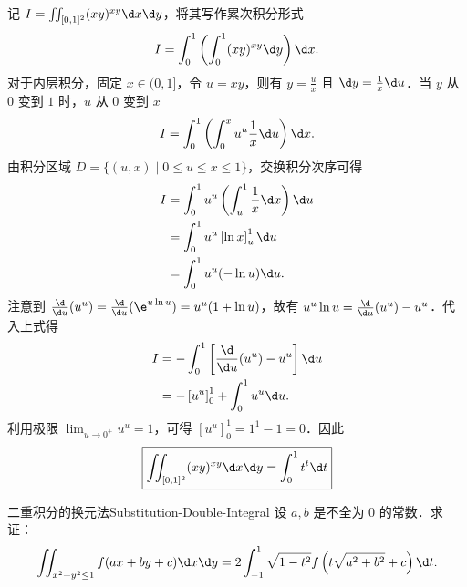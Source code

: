\begin{myproof}
    记 $I = \iint_{[0,1]^2} (xy)^{xy} \d x \d y$，将其写作累次积分形式
    \begin{equation}
        I = \int_0^1 \left( \int_0^1 (xy)^{xy} \d y \right) \d x.
    \end{equation}
    对于内层积分，固定 $x \in (0, 1]$，令 $u = xy$，则有 $y = \frac{u}{x}$ 且 $\d y = \frac{1}{x} \d u$．当 $y$ 从 $0$ 变到 $1$ 时，$u$ 从 $0$ 变到 $x$
    \begin{equation}
        I = \int_0^1 \left( \int_0^x u^u \frac{1}{x} \d u \right) \d x.
    \end{equation}
    由积分区域 $D = \{(u, x) \mid 0 \le u \le x \le 1\}$，交换积分次序可得
    \begin{equation}
        \begin{aligned}
            I & = \int_0^1 u^u \left( \int_u^1 \frac{1}{x} \d x \right) \d u \\
              & = \int_0^1 u^u \left[ \ln x \right]_u^1 \d u                 \\
              & = \int_0^1 u^u (-\ln u) \d u.
        \end{aligned}
    \end{equation}
    注意到 $\frac{\d}{\d u} (u^u) = \frac{\d}{\d u} (\e^{u \ln u}) = u^u (1 + \ln u)$，故有 $u^u \ln u = \frac{\d}{\d u} (u^u) - u^u$．代入上式得
    \begin{equation}
        \begin{aligned}
            I & = - \int_0^1 \left[ \frac{\d}{\d u} (u^u) - u^u \right] \d u \\
              & = - \left[ u^u \right]_0^1 + \int_0^1 u^u \d u.
        \end{aligned}
    \end{equation}
    利用极限 $\lim_{u \to 0^+} u^u = 1$，可得 $\left[ u^u \right]_0^1 = 1^1 - 1 = 0$．因此
    \begin{equation}
        \boxed{\iint_{[0,1]^2} (xy)^{xy} \d x \d y = \int_0^1 t^t \d t}
    \end{equation}
\end{myproof}

\begin{problem}{二重积分的换元法}{Substitution-Double-Integral}
    设 $a, b$ 是不全为 $0$ 的常数．求证：
    \begin{equation}
        \iint_{x^2+y^2 \le 1} f(ax+by+c) \d x \d y = 2 \int_{-1}^1 \sqrt{1-t^2} f \left( t \sqrt{a^2+b^2} + c \right) \d t.
    \end{equation}
\end{problem}

